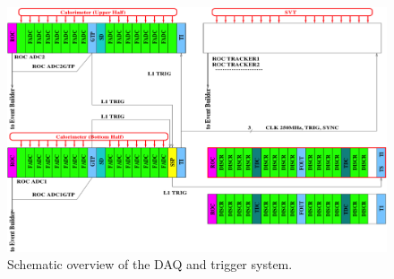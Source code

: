\documentclass[12pt]{article}
\begin{document}
%
%




\begin{figure}[htbp]
\begin{center}
    \includegraphics[width=\textwidth]{daq.png}
\caption{Schematic overview of the DAQ and trigger system.}
\label{fig:daq}
\end{center}
\end{figure}

\newpage

\end{document}
